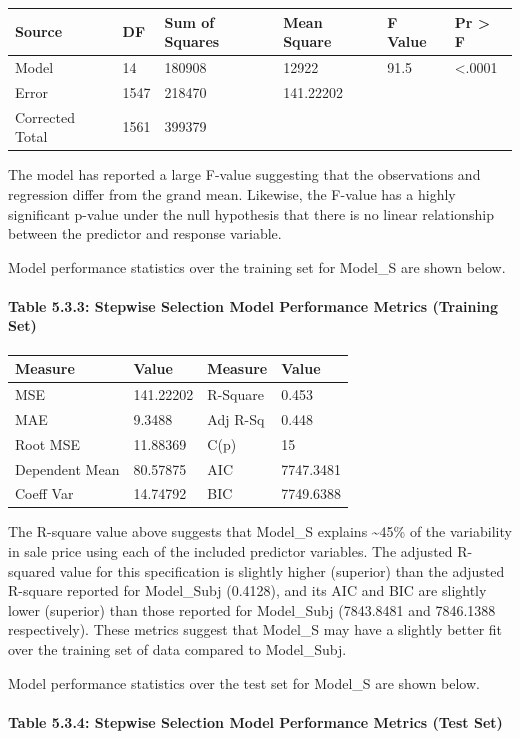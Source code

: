 \documentclass[]{article}
\let\oldparagraph\paragraph
\renewcommand{\paragraph}[1]{\oldparagraph{#1}\mbox{}}
\begin{document}
\begin{longtable}[]{@{}llllll@{}}
\toprule
Source & DF & Sum of Squares & Mean Square & F Value & Pr \textgreater{}
F\tabularnewline
\midrule
\endhead
Model & 14 & 180908 & 12922 & 91.5 & \textless{}.0001\tabularnewline
Error & 1547 & 218470 & 141.22202 & &\tabularnewline
Corrected Total & 1561 & 399379 & & &\tabularnewline
\bottomrule
\end{longtable}

The model has reported a large F-value suggesting that the observations
and regression differ from the grand mean. Likewise, the F-value has a
highly significant p-value under the null hypothesis that there is no
linear relationship between the predictor and response variable.

Model performance statistics over the training set for Model\_S are
shown below.

\paragraph{Table 5.3.3: Stepwise Selection Model Performance Metrics
(Training
Set)}\label{table-5.3.3-stepwise-selection-model-performance-metrics-training-set}

\begin{longtable}[]{@{}llll@{}}
\toprule
Measure & Value & Measure & Value\tabularnewline
\midrule
\endhead
MSE & 141.22202 & R-Square & 0.453\tabularnewline
MAE & 9.3488 & Adj R-Sq & 0.448\tabularnewline
Root MSE & 11.88369 & C(p) & 15\tabularnewline
Dependent Mean & 80.57875 & AIC & 7747.3481\tabularnewline
Coeff Var & 14.74792 & BIC & 7749.6388\tabularnewline
\bottomrule
\end{longtable}

The R-square value above suggests that Model\_S explains
\textasciitilde{}45\% of the variability in sale price using each of the
included predictor variables. The adjusted R-squared value for this
specification is slightly higher (superior) than the adjusted R-square
reported for Model\_Subj (0.4128), and its AIC and BIC are slightly
lower (superior) than those reported for Model\_Subj (7843.8481 and
7846.1388 respectively). These metrics suggest that Model\_S may have a
slightly better fit over the training set of data compared to
Model\_Subj.

Model performance statistics over the test set for Model\_S are shown
below.

\paragraph{Table 5.3.4: Stepwise Selection Model Performance Metrics
(Test
Set)}\label{table-5.3.4-stepwise-selection-model-performance-metrics-test-set}
\end{document}
